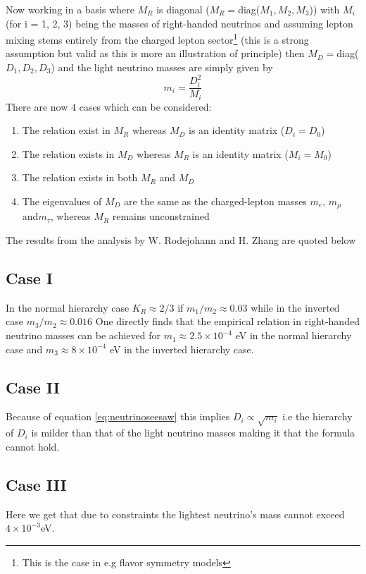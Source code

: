 \documentclass[twoside,twocolumn,11pt]{article} %
\begin{document}
Now working in a basis where $M_R$ is diagonal ($M_R =$diag($M_1,M_2,M_3$)) with $M_i$ (for i = 1, 2, 3) being the masses of right-handed neutrinos and assuming lepton mixing stems entirely from the charged lepton sector\footnote{This is the case in e.g flavor symmetry models} (this is a strong assumption but valid as this is more an illustration of principle) then $M_D=$diag($D_1,D_2,D_3$) and the light neutrino masses are simply given by
\begin{equation}
	m_i = \frac{D_i^2}{M_i}\label{eq:neutrinoseesaw}
\end{equation}
\newpage
There are now 4 cases which can be considered:
\begin{enumerate}
	\item The relation exist in $M_R$ whereas $M_D$ is an identity matrix ($D_i = D_0$)
	\item The relation exists in $M_D$ whereas $M_R$ is an identity matrix ($M_i = M_0$)
	\item The relation exists in both $M_R$ and $M_D$
	\item The eigenvalues of $M_D$ are the same as the charged-lepton masses $m_e$, $m_\mu$ and$ m_\tau$, whereas $M_R$ remains unconstrained
\end{enumerate}
The results from the analysis by W. Rodejohann and H. Zhang are quoted below
\subsection*{Case I}
In the normal hierarchy case $K_R \approx 2/3$ if $m_1/m_2 \approx 0.03$ while in the inverted case $m_3/m_2 \approx 0.016$
One directly finds that the empirical relation in right-handed neutrino masses can be achieved for $m_1 \approx 2.5 \times 10^{-4}$ eV in the normal hierarchy case and $m_3 \approx 8\times10^{-4}$ eV in the inverted hierarchy case.
\subsection*{Case II}
Because of equation \ref{eq:neutrinoseesaw} this implies $D_i \propto \sqrt{m_i}$ i.e the hierarchy of $D_i$ is milder than that of the light neutrino masses making it that the formula cannot hold.
\subsection*{Case III}
Here we get that due to constraints the lightest neutrino's mass cannot exceed $4\times 10^{-3}$eV.
\end{document}

